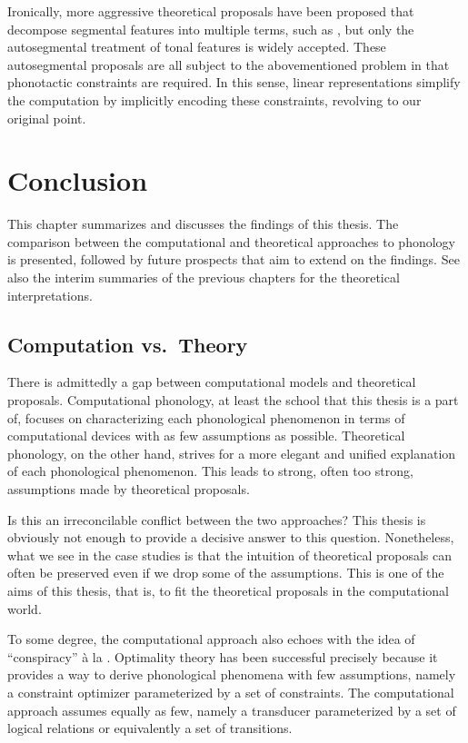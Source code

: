 \documentclass[12pt, a4paper]{report}
\begin{document}
Ironically, more aggressive theoretical proposals have been proposed
that decompose segmental features into multiple terms, such as
\textcite{klv85ispetcg}, but only the autosegmental treatment of tonal
features is widely accepted.  These autosegmental proposals are all
subject to the abovementioned problem in that phonotactic constraints
are required.  In this sense, linear representations simplify the
computation by implicitly encoding these constraints, revolving to our
original point.

\chapter{Conclusion}
This chapter summarizes and discusses the findings of this thesis.
The comparison between the computational and theoretical approaches to
phonology is presented, followed by future prospects that aim to
extend on the findings.  See also the interim summaries of the
previous chapters for the theoretical interpretations.

\section{Computation vs.\ Theory}
There is admittedly a gap between computational models and theoretical
proposals.  Computational phonology, at least the school that this
thesis is a part of, focuses on characterizing each phonological
phenomenon in terms of computational devices with as few assumptions
as possible.  Theoretical phonology, on the other hand, strives for a
more elegant and unified explanation of each phonological phenomenon.
This leads to strong, often too strong, assumptions made by
theoretical proposals.

Is this an irreconcilable conflict between the two approaches?  This
thesis is obviously not enough to provide a decisive answer to this
question.  Nonetheless, what we see in the case studies is that the
intuition of theoretical proposals can often be preserved even if we
drop some of the assumptions.  This is one of the aims of this thesis,
that is, to fit the theoretical proposals in the computational world.

To some degree, the computational approach also echoes with the idea
of \enquote{conspiracy} à la \textcite{k70fupr}.  Optimality theory
has been successful precisely because it provides a way to derive
phonological phenomena with few assumptions, namely a constraint
optimizer parameterized by a set of constraints.  The computational
approach assumes equally as few, namely a transducer parameterized by
a set of logical relations or equivalently a set of transitions.
\end{document}
